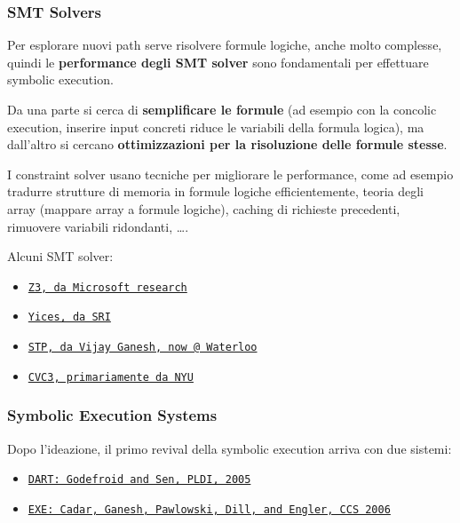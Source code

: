 \subsubsection{SMT Solvers}

Per esplorare nuovi path serve risolvere formule logiche, anche molto complesse, quindi le \textbf{performance degli SMT solver} sono fondamentali per effettuare symbolic execution.

Da una parte si cerca di \textbf{semplificare le formule} (ad esempio con la concolic execution, inserire input concreti riduce le variabili della formula logica), ma dall'altro si cercano \textbf{ottimizzazioni per la risoluzione delle formule stesse}. 

I constraint solver usano tecniche per migliorare le performance, come ad esempio tradurre strutture di memoria in formule logiche efficientemente, teoria degli array (mappare array a formule logiche), caching di richieste precedenti, rimuovere variabili ridondanti, \dots.

Alcuni SMT solver:
\begin{itemize}
	\item \href{http://z3.codeplex.com/}{\texttt{Z3, da Microsoft research}}

	\item \href{http://yices.csl.sri.com/}{\texttt{Yices, da SRI}}

	\item \href{https://sites.google.com/site/stpfastprover/}{\texttt{STP, da Vijay Ganesh, now @ Waterloo}}

	\item \href{http://www.cs.nyu.edu/acsys/cvc3/}{\texttt{CVC3, primariamente da NYU}}
\end{itemize}

\subsubsection{Symbolic Execution Systems}

Dopo l'ideazione, il primo revival della symbolic execution arriva con due sistemi:
\begin{itemize}
	\item \href{https://web.eecs.umich.edu/~weimerw/590/reading/p213-godefroid.pdf}{\texttt{DART: Godefroid and Sen, PLDI, 2005}}

	\item \href{https://www.cs.umd.edu/class/fall2023/cmsc614/papers/exe.pdf}{\texttt{EXE: Cadar, Ganesh, Pawlowski, Dill, and Engler, CCS 2006}}
\end{itemize}

